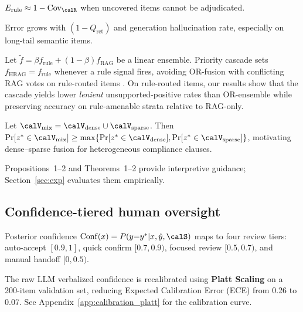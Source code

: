\begin{proposition}
$E_{\mathrm{rule}}\approx 1-\mathrm{Cov}_{\calR}$ when uncovered items cannot be adjudicated.
\end{proposition}

\begin{proposition}
Error grows with $(1-Q_{\mathrm{ret}})$ and generation hallucination rate, especially on long-tail semantic items.
\end{proposition}

\begin{theorem}
\label{thm:cascade}
Let $\tilde{f}=\beta f_{\mathrm{rule}}+(1-\beta)f_{\mathrm{RAG}}$ be a linear ensemble.
Priority cascade sets $f_{\mathrm{HRAG}}=f_{\mathrm{rule}}$ whenever a rule signal fires, avoiding OR-fusion with conflicting RAG votes on rule-routed items \cite{hu2016logicnn}.
On rule-routed items, our results show that the cascade yields lower \emph{lenient} unsupported-positive rates than OR-ensemble while preserving accuracy on rule-amenable strata relative to RAG-only.
\end{theorem}

\begin{theorem}
\label{thm:hybrid}
Let $\calV_{\mathrm{mix}}=\calV_{\mathrm{dense}}\cup\calV_{\mathrm{sparse}}$. Then $\Pr[z^*\in\calV_{\mathrm{mix}}]\ge \max\{\Pr[z^*\in\calV_{\mathrm{dense}}],\Pr[z^*\in\calV_{\mathrm{sparse}}]\}$, motivating dense--sparse fusion for heterogeneous compliance clauses.
\end{theorem}

Propositions~1--2 and Theorems~1--2 provide interpretive guidance; Section~\ref{sec:exp} evaluates them empirically.

\subsection{Confidence-tiered human oversight}

\begin{definition}
Posterior confidence $\mathrm{Conf}(x)=P(y{=}y^*|x,\hat{y},\calS)$ maps to four review tiers: auto-accept $[0.9,1]$, quick confirm $[0.7,0.9)$, focused review $[0.5,0.7)$, and manual handoff $[0,0.5)$.
\end{definition}

The raw LLM verbalized confidence is recalibrated using \textbf{Platt Scaling} on a 200-item validation set, reducing Expected Calibration Error (ECE) \cite{guo2017calibration} from 0.26 to 0.07. See Appendix~\ref{app:calibration_platt} for the calibration curve.

